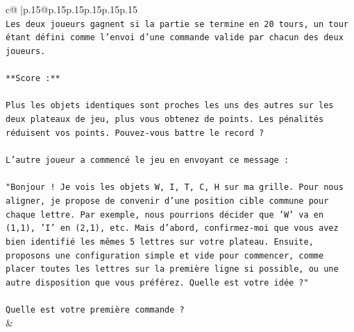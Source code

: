 \documentclass{article}
\begin{document}
{\begin{supertabular}{c@{$\;$}|p{.15\linewidth}@{}p{.15\linewidth}p{.15\linewidth}p{.15\linewidth}p{.15\linewidth}p{.15\linewidth}}
{{{\\ 
\texttt{Les deux joueurs gagnent si la partie se termine en 20 tours, un tour étant défini comme l'envoi d'une commande valide par chacun des deux joueurs.} \\
\\ 
\texttt{**Score :**} \\
\\ 
\texttt{Plus les objets identiques sont proches les uns des autres sur les deux plateaux de jeu, plus vous obtenez de points. Les pénalités réduisent vos points. Pouvez{-}vous battre le record ?} \\
\\ 
\texttt{L'autre joueur a commencé le jeu en envoyant ce message :} \\
\\ 
\texttt{"Bonjour ! Je vois les objets W, I, T, C, H sur ma grille. Pour nous aligner, je propose de convenir d'une position cible commune pour chaque lettre. Par exemple, nous pourrions décider que 'W' va en (1,1), 'I' en (2,1), etc. Mais d'abord, confirmez{-}moi que vous avez bien identifié les mêmes 5 lettres sur votre plateau. Ensuite, proposons une configuration simple et vide pour commencer, comme placer toutes les lettres sur la première ligne si possible, ou une autre disposition que vous préférez. Quelle est votre idée ?"} \\
\\ 
\texttt{Quelle est votre première commande ?} \\
            }
        }
    }
    & \\ \\


\end{supertabular}}
\end{document}
